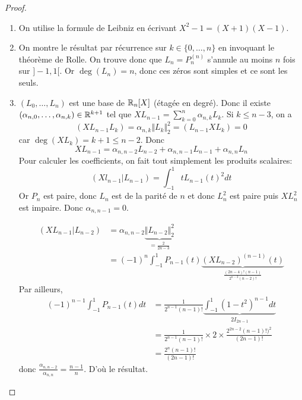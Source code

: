 \documentclass[12pt]{article}
\begin{document}
\begin{proof}
\begin{enumerate}
		\item On utilise la formule de Leibniz en écrivant $X^{2}-1=(X+1)(X-1)$.
		\item On montre le résultat par récurrence sur $k\in\{0,\dots,n\}$ en invoquant le théorème de Rolle. On trouve donc que $L_{n}=P_{n}^{(n)}$ s'annule au moins $n$ fois sur $]-1,1[$. Or $\deg(L_{n})=n$, donc ces zéros sont simples et ce sont les seuls.
		\item $(L_{0},\dots,L_{n})$ est une base de $\mathbb{R}_{n}[X]$ (étagée en degré). Donc il existe $(\alpha_{n,0},\dots,\alpha_{n,k})\in\mathbb{R}^{k+1}$ tel que $XL_{n-1}=\sum_{k=0}^{n}\alpha_{n,k}L_{k}$. Si $k\leqslant n-3$, on a
		\begin{equation}(XL_{n-1} L_{k})=\alpha_{n,k}\Vert L_{k}\Vert_{2}^{2}=(L_{n-1}XL_{k})=0\end{equation}
		car $\deg(XL_{k})=k+1\leqslant n-2$. Donc 
		\begin{equation}XL_{n-1}=\alpha_{n,n-2}L_{n-2}+\alpha_{n,n-1}L_{n-1}+\alpha_{n,n}L_{n}\end{equation}
		Pour calculer les coefficients, on fait tout simplement les produits scalaires:
		\begin{equation}(Xl_{n-1}|L_{n-1})=\int_{-1}^{1}tL_{n-1}(t)^{2}dt\end{equation}
		Or $P_{n}$ est paire, donc $L_{n}$ est de la parité de $n$ et donc $L_{n}^{2}$ est paire puis $XL_{n}^{2}$ est impaire. Donc $\alpha_{n,n-1}=0$.

		\begin{align}
			(XL_{n-1}|L_{n-2})
			&=\alpha_{n,n-2}\underbrace{\Vert L_{n-2}\Vert_{2}^{2}}_{=\frac{2}{2n-3}}\\
			&=(-1)^{n}\int_{-1}^{1}P_{n-1}(t)\underbrace{(XL_{n-2})^{(n-1)}(t)}_{\frac{(2n-4)!(n-1)}{2^{n-2}(n-2)!}}
		\end{align}
		Par ailleurs,
		\begin{align}
			(-1)^{n-1}\int_{-1}^{1}P_{n-1}(t)dt
			&=\frac{1}{2^{n-1}(n-1)!}\underbrace{\int_{-1}^{1}(1-t^{2})^{n-1}dt}_{2I_{2n-1}}\\
			&=\frac{1}{2^{n-1}(n-1)!}\times 2\times\frac{2^{2n-2}(n-1)!)^{2}}{(2n-1)!}\\
			&=\frac{2^{n}(n-1)!}{(2n-1)!}
		\end{align}
		donc $\frac{\alpha_{n,n-2}}{\alpha_{n,n}}=\frac{n-1}{n}$. D'où le résultat.
	\end{enumerate}
\end{proof}
\end{document}
